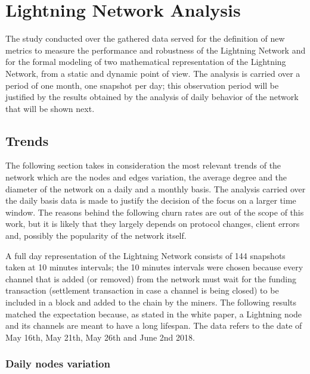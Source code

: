 
	\chapter{Lightning Network Analysis}
	
	The study conducted over the gathered data served for the definition of new metrics to measure the performance and robustness of the Lightning Network and for the formal modeling of two mathematical representation of the Lightning Network, from a static and dynamic point of view. The analysis is carried over a period of one month, one snapshot per day; this observation period will be justified by the results obtained by the analysis of daily behavior of the network that will be shown next.
	
	\section{Trends}
	
	The following section takes in consideration the most relevant trends of the network which are the nodes and edges variation, the average degree and the diameter of the network on a daily and a monthly basis. The analysis carried over the daily basis data is made to justify the decision of the focus on a larger time window. The reasons behind the following churn rates are out of the scope of this work, but it is likely that they largely depends on protocol changes, client errors and, possibly the popularity of the network itself.
	
	A full day representation of the Lightning Network consists of 144 snapshots taken at 10 minutes intervals; the 10 minutes intervals were chosen because every channel that is added (or removed) from the network must wait for the funding transaction (settlement transaction in case a channel is being closed) to be included in a block and added to the chain by the miners. The following results matched the expectation because, as stated in the white paper, a Lightning node and its channels are meant to have a long lifespan. The data refers to the date of May 16th, May 21th, May 26th and June 2nd 2018.
	
	\subsection{Daily nodes variation}
	
